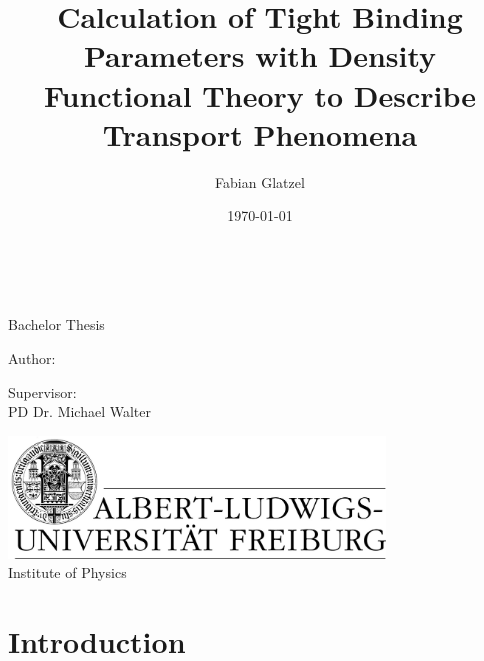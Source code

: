 \documentclass[english,a4paper,10pt,twoside, headsepline, bibliography=totocnumbered, listof=totocnumbered]{scrbook}
\author{Fabian Glatzel}
\title{Calculation of Tight Binding Parameters with Density Functional Theory to Describe Transport Phenomena}
\date{\today}
\begin{document}
\begin{titlepage}
\centering 
\huge\thetitle\\ 
 
\vspace*{1cm}
 
\Large Bachelor Thesis\\
\vspace*{2cm}
\begin{minipage}{0.49\textwidth}
Author:\\
\theauthor
\end{minipage}
\begin{minipage}{0.49\textwidth}
\begin{flushright}
Supervisor:\\
PD Dr. Michael Walter	
\end{flushright}
\end{minipage}
\vspace*{2cm}
 
\includegraphics[width=10cm]{Images/logo_freiburg}\\
Institute of Physics\\
\vspace*{5cm}
\thedate
\normalsize 
\end{titlepage}

\cleardoublepage







\tableofcontents
{}

\chapter{Introduction}



\listoffigures


\end{document}
